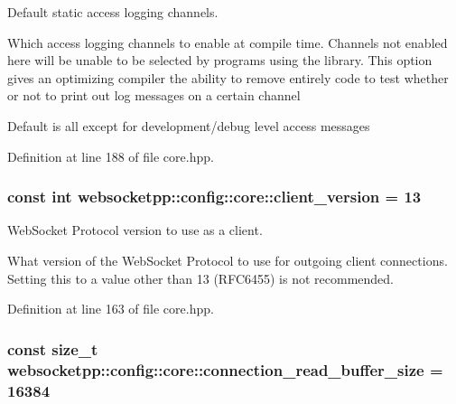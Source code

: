 Default static access logging channels. 

Which access logging channels to enable at compile time. Channels not enabled here will be unable to be selected by programs using the library. This option gives an optimizing compiler the ability to remove entirely code to test whether or not to print out log messages on a certain channel

Default is all except for development/debug level access messages 

Definition at line 188 of file core.\+hpp.

\hypertarget{structwebsocketpp_1_1config_1_1core_af3b087e00d7793c8ae291566f8988375}{}
\subsubsection[{client\+\_\+version}]{\setlength{\rightskip}{0pt plus 5cm}const int websocketpp\+::config\+::core\+::client\+\_\+version = 13\hspace{0.3cm}{\ttfamily [static]}}\label{structwebsocketpp_1_1config_1_1core_af3b087e00d7793c8ae291566f8988375}


Web\+Socket Protocol version to use as a client. 

What version of the Web\+Socket Protocol to use for outgoing client connections. Setting this to a value other than 13 (R\+F\+C6455) is not recommended. 

Definition at line 163 of file core.\+hpp.

\hypertarget{structwebsocketpp_1_1config_1_1core_af1f28eec2b5e12b6d7cccb0c87835119}{}
\subsubsection[{connection\+\_\+read\+\_\+buffer\+\_\+size}]{\setlength{\rightskip}{0pt plus 5cm}const size\+\_\+t websocketpp\+::config\+::core\+::connection\+\_\+read\+\_\+buffer\+\_\+size = 16384\hspace{0.3cm}{\ttfamily [static]}}\label{structwebsocketpp_1_1config_1_1core_af1f28eec2b5e12b6d7cccb0c87835119}


